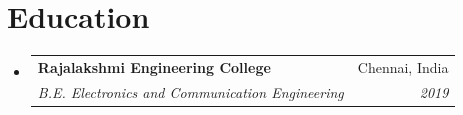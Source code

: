 \documentclass[a4paper,20pt]{article}
\makeatletter
\newcommand{\resumeSubheading}[4]{
  \vspace{-2pt}\item
    \begin{tabular*}{0.97\textwidth}{l@{\extracolsep{\fill}}r}
      \textbf{#1} & #2 \\
      \textit{#3} & \textit{#4} \\
    \end{tabular*}\vspace{-6pt}
}
\makeatother
\begin{document}
\section{Education}
\begin{itemize}[leftmargin=*]
\resumeSubheading
{Rajalakshmi Engineering College}{Chennai, India}
{B.E. Electronics and Communication Engineering}{2019}
\end{itemize}
\end{document}
